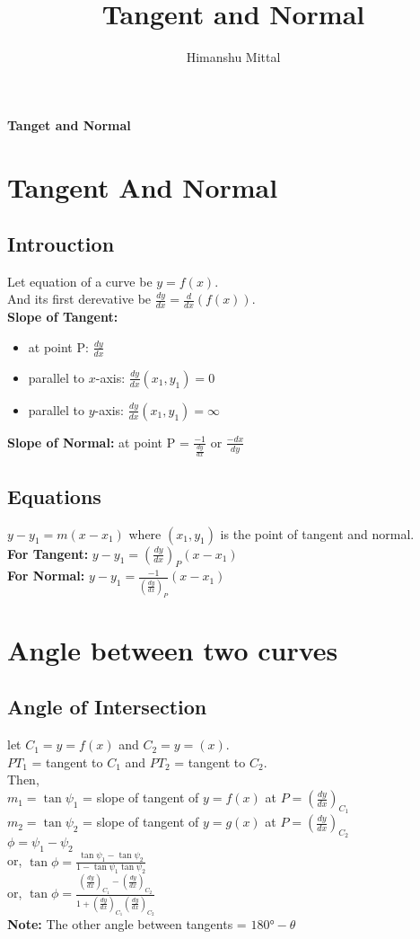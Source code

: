 \documentclass[11pt,a4paper,landscape]{article}
\author{Himanshu Mittal}
\title{Tangent and Normal}
\begin{document}
\begin{multicols*}{2}
{\noindent \bfseries {\Huge Tanget and Normal}}\\
\section{Tangent And Normal}
	\subsection{Introuction}
	Let equation of a curve be $y=f(x)$.\\
	And its first derevative be $\displaystyle{\frac{dy}{dx}=\frac{d}{dx}(f(x))}$.\\
	\textbf{Slope of Tangent:}
	\begin{itemize}
	\item at point P: $\frac{dy}{dx}$
	\item parallel to $x$-axis: $\displaystyle{\frac{dy}{dx}(x_1,y_1)=0}$
	\item parallel to $y$-axis: $\displaystyle{\frac{dy}{dx}(x_1,y_1)=\infty}$
	\end{itemize}

	\textbf{Slope of Normal:} at point P = $\frac{-1}{\frac{dy}{dx}}$ or $\frac{-dx}{dy}$
	\subsection{Equations}
	$y-y_1=m(x-x_1)$ where $(x_1,y_1)$ is the point of tangent and normal.\\
	\textbf{For Tangent:} $\displaystyle{y-y_1=\left(\frac{dy}{dx}\right)_P(x-x_1)}$\\
	\textbf{For Normal:} $\displaystyle{y-y_1=\frac{-1}{\left(\frac{dy}{dx}\right)_P}(x-x_1)}$
\section{Angle between two curves}
	\subsection{Angle of Intersection}
	let $C_1=y=f(x)$ and $C_2=y=(x)$.\\
	$PT_1$ = tangent to $C_1$ and $PT_2$ = tangent to $C_2$.\\
	Then,\\
	$m_1=\tan{\psi_1}$ = slope of tangent of $y=f(x)$ at $P=\left(\frac{dy}{dx}\right)_{C_1}$\\
	$m_2=\tan{\psi_2}$ = slope of tangent of $y=g(x)$ at $P=\left(\frac{dy}{dx}\right)_{C_2}$\\
	$\phi=\psi_1-\psi_2$\\
	or, $\displaystyle{\tan{\phi}=\frac{\tan{\psi_1}-\tan{\psi_2}}{1-\tan{\psi_1}\tan{\psi_2}}}$\\
	or, $\displaystyle{\tan{\phi}=\frac{\left(\frac{dy}{dx}\right)_{C_1}-\left(\frac{dy}{dx}\right)_{C_2}}{1+\left(\frac{dy}{dx}\right)_{C_1}\left(\frac{dy}{dx}\right)_{C_2}}}$\\
	\textbf{Note:} The other angle between tangents = $\ang{180}-\theta$

\end{multicols*}
\end{document}
